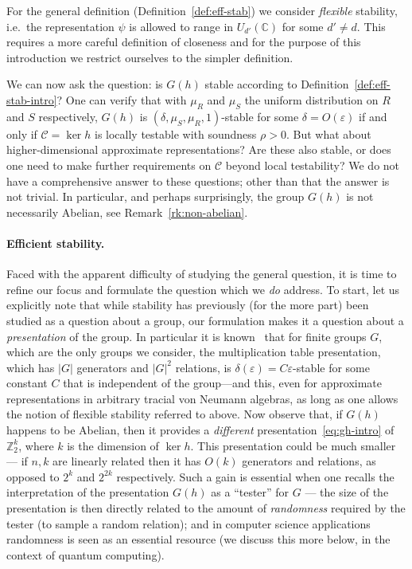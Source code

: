 \documentclass[11pt]{article}
\theoremstyle{definition}
\newcommand{\code}{\mathscr{C}}
\newcommand{\C}{\ensuremath{\mathbb{C}}}
\newcommand{\Z}{\ensuremath{\mathbb{Z}}}
\newcommand{\eps}{\varepsilon}
\begin{document}
For the general definition (Definition~\ref{def:eff-stab}) we consider \emph{flexible} stability, i.e.\ the representation $\psi$ is allowed to range in $U_{d'}(\C)$ for some $d'\neq d$. This requires a more careful definition of closeness and for the purpose of this introduction we restrict ourselves to the simpler definition. 

We can now ask the question: is $G(h)$ stable according to Definition~\ref{def:eff-stab-intro}? One can verify that with $\mu_R$ and $\mu_S$ the uniform distribution on $R$ and $S$ respectively, $G(h)$ is $(\delta,\mu_S,\mu_R,1)$-stable for some $\delta=O(\eps)$ if and only if $\code = \ker h$ is locally testable with soundness $\rho>0$. But what about higher-dimensional approximate representations? Are these also stable, or does one need to make further requirements on $\code$ beyond local testability? We do not have a comprehensive answer to these questions; other than that the answer is not trivial. In particular, and perhaps surprisingly, the group $G(h)$ is not necessarily Abelian, see Remark~\ref{rk:non-abelian}. 

\paragraph{Efficient stability.}
Faced with the apparent difficulty of studying the general question, it is time to refine our focus and formulate the question which we \emph{do} address. To start, let us explicitly note that 
while stability has previously (for the more part) been studied as a question about a group, our formulation makes it a question about a \emph{presentation} of the group. In particular it is known~\cite{gowers2017inverse,de2019operator} that for finite groups $G$, which are the only groups we consider, the multiplication table presentation, which has $|G|$ generators and $|G|^2$ relations, is $\delta(\eps)=C\eps$-stable for some constant $C$ that is independent of the group---and this, even for approximate representations in arbitrary tracial von Neumann algebras, as long as one allows the notion of flexible stability referred to above. Now observe that, if $G(h)$ happens to be Abelian, then it provides a \emph{different} presentation~\eqref{eq:gh-intro} of $\Z_2^k$, where $k$ is the dimension of $\ker h$. This presentation could be much smaller --- if $n,k$ are linearly related then it has $O(k)$ generators and relations, as opposed to $2^k$ and $2^{2k}$ respectively. Such a gain is essential when one recalls the interpretation of the presentation $G(h)$ as a ``tester'' for $G$ --- the size of the presentation is then directly related to the amount of \emph{randomness} required by the tester (to sample a random relation); and in computer science applications randomness is seen as an essential resource (we discuss this more below, in the context of quantum computing). 
\end{document}

